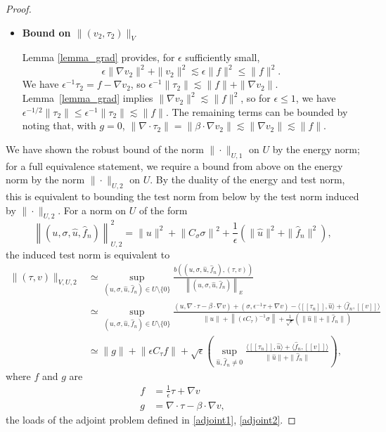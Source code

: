 \documentclass[11pt,onecolumn]{scrartcl}
\newcommand{\nor}[1]{\left\| #1 \right\|}
\newcommand{\LRs}[1]{\left[ #1 \right]}
\newcommand{\jump}[1] {\ensuremath{\LRs{\![#1]\!}}}
\newcommand{\grad}{\nabla}
\renewcommand{\div}{\grad \cdot}
\begin{document}
\begin{proof}
\begin{itemize}
\item \textbf{Bound on $\|\left(v_{2},\tau_{2}\right)\|_V$}

Lemma \ref{lemma_grad} provides, for $\epsilon$ sufficiently small, 
\[
\epsilon \|\grad v_2\|^2 + \|v_2\|^2 \lesssim  \epsilon \| f\|^2 \leq \|f\|^2.
\]
We have $\epsilon^{-1}\tau_2 = f - \grad v_2$, so $\epsilon^{-1} \|\tau_2\| \lesssim \|f\| + \|\grad v_2\|$. Lemma~\ref{lemma_grad} implies $\|\grad v_2\|^2  \lesssim  \| f\|^2$, so for $\epsilon \leq 1$, we have $\epsilon^{-1/2}\|\tau_2\| \leq \epsilon^{-1}\|\tau_2\| \lesssim \|f\|$.  The remaining terms can be bounded by noting that, with $g = 0$, $\|\div \tau_2\| = \|\beta\cdot \grad v_2\| \lesssim \|\grad v_2\| \lesssim \|f\| $.
\end{itemize}

We have shown the robust bound of the norm $\|\cdot \|_{U,1}$ on $U$ by the energy norm; for a full equivalence statement, we require a bound from above on the energy norm by the norm $\|\cdot \|_{U,2}$ on $U$.  By the duality of the energy and test norm, this is equivalent to bounding the test norm from below by the test norm induced by $\|\cdot \|_{U,2}$. 
For a norm on $U$ of the form
\[
\left\|\left(u,\sigma,\widehat{u},\widehat{f}_n\right)\right\|_{U,2}^2 = \|u\|^2 + \nor{C_\sigma \sigma}^2 + \frac{1}{{\epsilon}}\left( \|\widehat{u}\|^2 + \|\widehat{f}_n\|^2\right),
\]
the induced test norm is equivalent to
\begin{align*}
\| \left(\tau,v\right) \|_{V,U,2} &\simeq \sup_{\left(u,\sigma,\widehat{u},\widehat{f}_n\right) \in U\setminus \{0\}} \frac{b\left(\left(u,\sigma,\widehat{u},\widehat{f}_n\right),\left(\tau,v\right)\right)}{\left\|\left(u,\sigma,\widehat{u},\widehat{f}_n\right)\right\|_E} \\
&\simeq \sup_{\left(u,\sigma,\widehat{u},\widehat{f}_n\right) \in U\setminus \{0\}} \frac{\left(u,\div \tau - \beta \cdot \grad v\right) + \left(\sigma, \epsilon^{-1} \tau + \grad v\right) - \langle \jump{\tau_n}, \widehat{u} \rangle + \langle \widehat{f}_n, \jump{v} \rangle
}{\|u\| + \nor{\left(\epsilon C_\tau\right)^{-1}\sigma} + \frac{1}{\sqrt{\epsilon}}\left(  \|\widehat{u}\| + \|\widehat{f}_n\| \right)} \\
&\simeq \|g\| + \nor{\epsilon C_\tau f} + {\sqrt{\epsilon}}\left(\sup_{\widehat{u},\widehat{f}_n \neq 0}\frac{\langle \jump{\tau_n}, \widehat{u} \rangle + \langle \widehat{f}_n, \jump{v} \rangle}{\|\widehat{u}\| + \|\widehat{f}_n\|}\right),
\end{align*}
where $f$ and $g$ are 
\begin{align*}
f &= \frac{1}{\epsilon}\tau + \grad v\\
g &= \div \tau - \beta \cdot \grad v,
\end{align*}
the loads of the adjoint problem defined in \eqref{adjoint1}, \eqref{adjoint2}.  


\end{proof}
\end{document}
